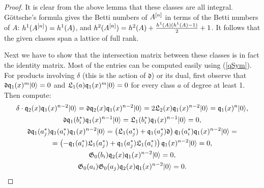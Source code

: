 \begin{proof} It is clear from the above lemma that these classes are all integral.
G\"ottsche's formula \cite[p.~35]{Gottsche} gives the Betti numbers of $A^{[n]}$ in terms of the Betti numbers of $A$: 
$h^1(A^{[n]}) = h^1(A)$, and $h^2(A^{[n]}) = h^2(A)+ \frac{h^1(A)(h^1(A)-1)}{2} + 1$. It follows that the given classes span a lattice of full rank.

Next we have to show that the intersection matrix between these classes is in fact the identity matrix. Most of the entries can be computed easily using (\ref{qSym}). For products involving $\delta$ (this is the action of $\mathfrak{d}$) or its dual, first observe that $\mathfrak{d}\mathfrak{q}_1(x)^m|0\rangle = 0 $ and $ \mathfrak{L}_1(a)\mathfrak{q}_1(x)^m|0\rangle =0$ for every class $a$ of degree at least 1. Then compute:
\begin{gather*}
\delta \cdot\mathfrak{q}_2(x)\mathfrak{q}_{1}(x)^{n-2} |0\rangle = \mathfrak{d}\mathfrak{q}_2(x)\mathfrak{q}_{1}(x)^{n-2} |0\rangle = 2 \mathfrak{L}_2(x) \mathfrak{q}_{1}(x)^{n-2} |0\rangle = \mathfrak{q}_{1}(x)^{n}|0\rangle,
\\
\mathfrak{d}\mathfrak{q}_{1}(b_{i}^*)\mathfrak{q}_{1}(x)^{n-1}|0\rangle =  \mathfrak{L}_1(b_i^*) \mathfrak{q}_{1}(x)^{n-1} |0\rangle = 0,
\\
\mathfrak{d}\mathfrak{q}_{1}(a_{j}^*)\mathfrak{q}_{1}(a_{i}^*)\mathfrak{q}_{1}(x)^{n-2}|0\rangle = \left(\mathfrak{L}_1(a_j^*) +\mathfrak{q}_{1}(a_{j}^*)\mathfrak{d}\right)\mathfrak{q}_{1}(a_{i}^*)\mathfrak{q}_{1}(x)^{n-2}|0\rangle = 
  \\ =\left(-\mathfrak{q}_1(a_i^*)\mathfrak{L}_1(a_j^*) + \mathfrak{q}_{1}(a_{j}^*)\mathfrak{L}_1(a_i^*)\right)\mathfrak{q}_{1}(x)^{n-2}|0\rangle  = 0,
\\
\mathfrak{G}_0(b_i)\mathfrak{q}_2(x)\mathfrak{q}_{1}(x)^{n-2} |0\rangle = 0, 
\\
\mathfrak{G}_0(a_i)\mathfrak{G}_0(a_j)\mathfrak{q}_2(x)\mathfrak{q}_{1}(x)^{n-2} |0\rangle = 0.
\end{gather*}
\end{proof}


